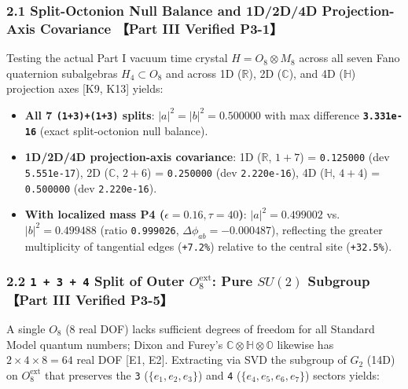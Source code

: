 \documentclass[
  a4paper,
]{article}
\providecommand{\tightlist}{%
  \setlength{\itemsep}{0pt}\setlength{\parskip}{0pt}}
\begin{document}
\subsubsection{2.1 Split-Octonion Null Balance and 1D/2D/4D
Projection-Axis Covariance 【Part III Verified
P3-1】}\label{split-octonion-null-balance-and-1d2d4d-projection-axis-covariance-part-iii-verified-p3-1}

Testing the actual Part I vacuum time crystal \(H = O_8 \otimes M_8\)
across all seven Fano quaternion subalgebras \(H_4 \subset O_8\) and
across 1D (\(\mathbb{R}\)), 2D (\(\mathbb{C}\)), and 4D (\(\mathbb{H}\))
projection axes {[}K9, K13{]} yields:

\begin{itemize}
\tightlist
\item
  \textbf{All 7 \texttt{(1+3)+(1+3)} splits}:
  \(|a|^2 = |b|^2 = 0.500000\) with max difference
  \textbf{\texttt{3.331e-16}} (exact split-octonion null balance).
\item
  \textbf{1D/2D/4D projection-axis covariance}: 1D (\(\mathbb{R}\),
  \(1+7\)) = \texttt{0.125000} (dev \texttt{5.551e-17}), 2D
  (\(\mathbb{C}\), \(2+6\)) = \texttt{0.250000} (dev
  \texttt{2.220e-16}), 4D (\(\mathbb{H}\), \(4+4\)) = \texttt{0.500000}
  (dev \texttt{2.220e-16}).
\item
  \textbf{With localized mass P4 (\(\epsilon=0.16, \tau=40\))}:
  \(|a|^2 = 0.499002\) vs.~\(|b|^2 = 0.499488\) (ratio
  \texttt{0.999026}, \(\Delta\phi_{ab} = -0.000487\)), reflecting the
  greater multiplicity of tangential edges (\texttt{+7.2\%}) relative to
  the central site (\texttt{+32.5\%}).
\end{itemize}

\subsubsection{\texorpdfstring{2.2 \texttt{1\ +\ 3\ +\ 4} Split of Outer
\(O_8^{\mathrm{ext}}\): Pure \(SU(2)\) Subgroup 【Part III Verified
P3-5】}{2.2 1 + 3 + 4 Split of Outer O\_8\^{}\{\textbackslash mathrm\{ext\}\}: Pure SU(2) Subgroup 【Part III Verified P3-5】}}\label{split-of-outer-o_8mathrmext-pure-su2-subgroup-part-iii-verified-p3-5}

A single \(O_8\) (8 real DOF) lacks sufficient degrees of freedom for
all Standard Model quantum numbers; Dixon and Furey's
\(\mathbb{C}\otimes\mathbb{H}\otimes\mathbb{O}\) likewise has
\(2\times 4\times 8 = 64\) real DOF {[}E1, E2{]}. Extracting via SVD the
subgroup of \(G_2\) (14D) on \(O_8^{\mathrm{ext}}\) that preserves the
\texttt{3} (\(\{e_1,e_2,e_3\}\)) and \texttt{4}
(\(\{e_4,e_5,e_6,e_7\}\)) sectors yields:
\end{document}
